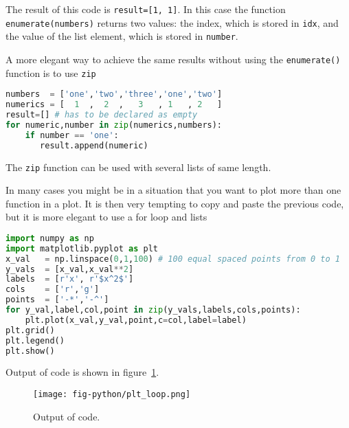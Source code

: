 \documentclass[graybox,sectrefs,envcountresetchap,open=right,final]{svmonodo}
\begin{document}
The result of this code is \texttt{result=[1, 1]}. In this case the function \texttt{enumerate(numbers)} returns two values: the index, which is stored in \texttt{idx}, and the value of the list element, which is stored in \texttt{number}.

A more elegant way to achieve the same results without using the \texttt{enumerate()} function is to use \texttt{zip}







\begin{lstlisting}[language=python,style=blue1bar]
numbers  = ['one','two','three','one','two']
numerics = [  1  ,  2  ,   3   , 1   , 2   ]
result=[] # has to be declared as empty
for numeric,number in zip(numerics,numbers):
    if number == 'one':
       result.append(numeric) 

\end{lstlisting}

The \texttt{zip} function can be used with several lists of same length.

In many cases you might be in a situation that you want to plot more than one function in a plot. It is then very tempting to copy and paste the previous code, but it is more elegant to use a for loop and lists













\begin{lstlisting}[language=python,style=blue1bar]
import numpy as np
import matplotlib.pyplot as plt
x_val   = np.linspace(0,1,100) # 100 equal spaced points from 0 to 1
y_vals  = [x_val,x_val**2]
labels  = [r'x', r'$x^2$']
cols    = ['r','g']
points  = ['-*','-^']
for y_val,label,col,point in zip(y_vals,labels,cols,points):
    plt.plot(x_val,y_val,point,c=col,label=label)
plt.grid()
plt.legend()
plt.show()

\end{lstlisting}

Output of code is shown in figure~\ref{fig:python:loop}.

\begin{figure}[!ht]  %
  \centerline{\texttt{[image: fig-python/plt\_loop.png]}}
  \caption{
  Output of code. \label{fig:python:loop}
  }
\end{figure}
\end{document}
